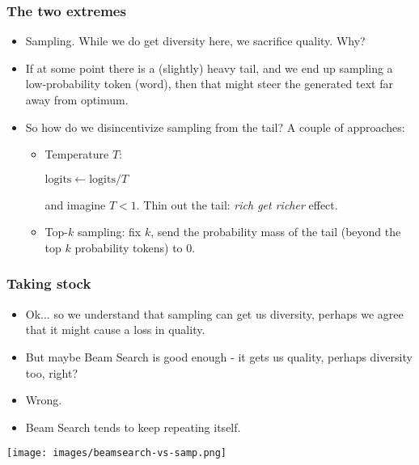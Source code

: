 \documentclass[11pt]{beamer}
\begin{document}
\begin{frame}
  \frametitle{The two extremes}
  \begin{itemize}
    \item Sampling. While we do get diversity here, we sacrifice quality. Why?
    \item If at some point there is a (slightly) heavy tail, and we end up sampling
    a low-probability token (word), then that might steer the generated text
    far away from optimum.
    \item So how do we disincentivize sampling from the tail? A couple of approaches:
    \begin{itemize}
      \item Temperature $T$:
      \begin{center}
        $\mathrm{logits} \leftarrow \mathrm{logits}/{T}$
      \end{center}
      and imagine $T < 1$. Thin out the tail: {\em rich get richer} effect.
      \item Top-$k$ sampling: fix $k$, send the probability mass of the tail (beyond the top $k$
      probability tokens) to $0$.
    \end{itemize}
  \end{itemize}
\end{frame}

\begin{frame}
  \frametitle{Taking stock}
  \begin{itemize}
\item
Ok... so we understand that sampling can get us diversity, perhaps we agree that it might cause
a loss in quality.
\pause
\item
But maybe Beam Search is good enough - it gets us quality, perhaps diversity too,
right?
\pause
  \item Wrong.
  \pause
  \item Beam Search tends to keep repeating itself.
\end{itemize}
\end{frame}

\begin{frame}
\begin{center}
\texttt{[image: images/beamsearch-vs-samp.png]}
\end{center}
\end{frame}
\end{document}
